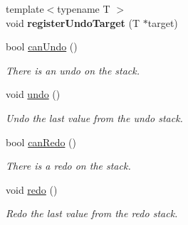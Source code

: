 \begin{DoxyCompactItemize}
{\footnotesize template$<$typename T $>$ }\\void {\bfseries register\+Undo\+Target} (T $\ast$target)
\item 
\mbox{\label{classCSUndoManager_aba7234583f74080689d126d142cee5fa}} 
bool \hyperlink{classCSUndoManager_aba7234583f74080689d126d142cee5fa}{can\+Undo} ()
\begin{DoxyCompactList}\small\item\em There is an undo on the stack. \end{DoxyCompactList}\item 
\mbox{\label{classCSUndoManager_af604822084540cbee8a7b99dd6139600}} 
void \hyperlink{classCSUndoManager_af604822084540cbee8a7b99dd6139600}{undo} ()
\begin{DoxyCompactList}\small\item\em Undo the last value from the undo stack. \end{DoxyCompactList}\item 
\mbox{\label{classCSUndoManager_aac205c66f6620adc3785321f52679023}} 
bool \hyperlink{classCSUndoManager_aac205c66f6620adc3785321f52679023}{can\+Redo} ()
\begin{DoxyCompactList}\small\item\em There is a redo on the stack. \end{DoxyCompactList}\item 
\mbox{\label{classCSUndoManager_ae87a60c82efa48a8693a08bf6502ebc9}} 
void \hyperlink{classCSUndoManager_ae87a60c82efa48a8693a08bf6502ebc9}{redo} ()
\begin{DoxyCompactList}\small\item\em Redo the last value from the redo stack. \end{DoxyCompactList}\end{DoxyCompactItemize}
